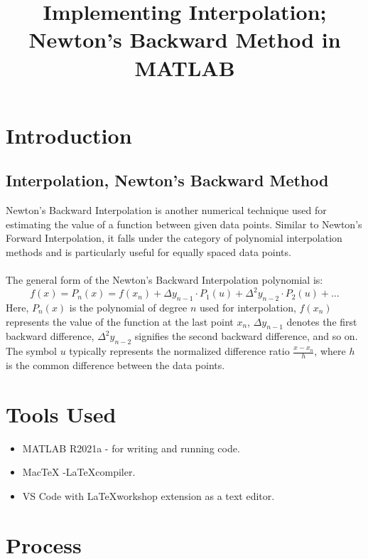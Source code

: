 \clearpage
\title{Implementing Interpolation; Newton's Backward Method in MATLAB }
\author{}
\date{}
\maketitle

\section*{Introduction}
\subsection*{Interpolation, Newton's Backward Method}
Newton's Backward Interpolation is another numerical technique used for estimating the value of a function between given data points. Similar to Newton's Forward Interpolation, it falls under the category of polynomial interpolation methods and is particularly useful for equally spaced data points.\\\\
The general form of the Newton's Backward Interpolation polynomial is:
\[f(x) = P_n(x) = f(x_n) + \Delta y_{n-1} \cdot P_1(u) + \Delta^2 y_{n-2} \cdot P_2(u) + \ldots\]
Here, \(P_n(x)\) is the polynomial of degree \(n\) used for interpolation, \(f(x_n)\) represents the value of the function at the last point \(x_n\), \(\Delta y_{n-1}\) denotes the first backward difference, \(\Delta^2 y_{n-2}\) signifies the second backward difference, and so on. The symbol \(u\) typically represents the normalized difference ratio \(\frac{x - x_n}{h}\), where \(h\) is the common difference between the data points.


\section*{Tools Used}
\begin{itemize}
    \item MATLAB R2021a - for writing and running code.
    \item MacTeX -\LaTeX  compiler.
    \item VS Code with \LaTeX workshop extension as a text editor.
\end{itemize}

\section*{Process}

